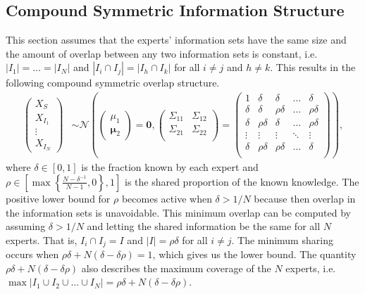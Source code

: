 \documentclass[11pt,twoside]{article}
\begin{document}
\subsection{Compound Symmetric Information Structure}

This section assumes that the experts' information sets have the same size and the amount of overlap between any two information sets is constant, i.e.  $|I_{1}| =  \dots = |I_{N}|$ and $|I_{i} \cap I_{j}| = |I_{h} \cap I_{k}|$ for all $i \neq j$ and $h \neq k$. This results in the following compound symmetric overlap structure. 
\begin{align*}
\left(\begin{matrix} X_{S} \\ X_{I_1}\\ \vdots \\ X_{I_N} \end{matrix}\right) &\sim \mathcal{N}\left( \left(\begin{matrix} 
\mu_1 \\ \boldsymbol{\mu}_2
 \end{matrix}\right) =
 \boldsymbol{0}, \left(\begin{matrix} 
\Sigma_{11} & \Sigma_{12}\\
\Sigma_{21} & \Sigma_{22}\\
 \end{matrix}\right) 
 =
 \left(\begin{array}{c|cccc}
1 & \delta & \delta & \dots & \delta  \\ \hline
\delta & \delta &\rho\delta & \dots & \rho\delta   \\ 
\delta & \rho\delta & \delta & \dots & \rho\delta  \\ 
\vdots & \vdots & \vdots & \ddots & \vdots  \\ 
\delta & \rho\delta & \rho\delta & \dots & \delta\\ 
 \end{array}\right)\right),
\end{align*}
where $\delta \in [0,1]$ is the fraction known by each expert and $\rho \in \left[  \max \left\{ \frac{N-\delta^{-1}}{N-1}, 0\right\}, 1 \right]$ is the shared proportion of the known knowledge. The positive lower bound for $\rho$ becomes active when $\delta > 1/N$ because then overlap in the information sets is unavoidable. This minimum overlap can be computed by assuming $\delta > 1/N$ and letting the shared information be the same for all $N$ experts. That is, $I_{i} \cap I_j = I$ and $|I| =  \rho \delta$ for all $i \neq j$. The minimum sharing occurs when $\rho\delta + N(\delta - \delta\rho) = 1$, which gives us the lower bound. The quantity  $\rho\delta + N(\delta - \delta\rho)$ also describes the maximum coverage of the $N$ experts, i.e. $\max | I_1 \cup I_2 \cup \dots \cup I_N| = \rho\delta + N(\delta - \delta\rho)$. 
\end{document}
